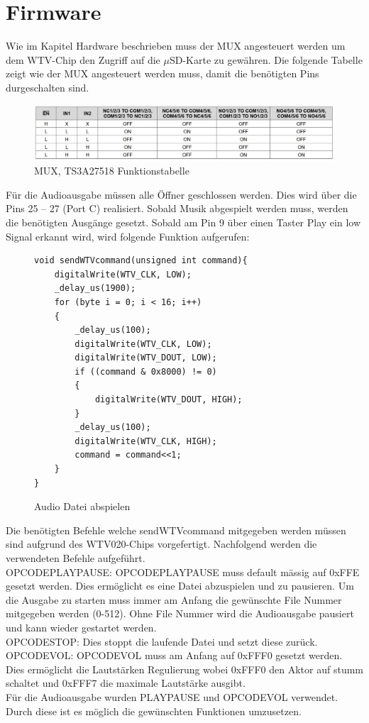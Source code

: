 \section{Firmware}
Wie im Kapitel Hardware beschrieben muss der MUX angesteuert werden um dem WTV-Chip den Zugriff auf die $\mu$SD-Karte zu gewähren. Die folgende Tabelle zeigt wie der MUX angesteuert werden muss, damit die benötigten Pins durgeschalten sind.

\begin{figure}[h]
	\centering
	\includegraphics[width=15cm]{Bilder/MuxTab.jpg}
	\caption{MUX, TS3A27518 Funktionstabelle}
	\label{MUX-Tabelle}
\end{figure}

Für die Audioausgabe müssen alle Öffner geschlossen werden. Dies wird über die Pins 25 – 27 (Port C) realisiert. Sobald Musik abgespielt werden muss, werden die benötigten Ausgänge gesetzt. Sobald am Pin 9 über einen Taster Play ein low Signal erkannt wird, wird folgende Funktion aufgerufen:
\begin{figure}[h]
	\begin{verbatim}
void sendWTVcommand(unsigned int command){
	digitalWrite(WTV_CLK, LOW);
	_delay_us(1900);
	for (byte i = 0; i < 16; i++)
	{
		_delay_us(100);
		digitalWrite(WTV_CLK, LOW);
		digitalWrite(WTV_DOUT, LOW);
		if ((command & 0x8000) != 0)
		{
			digitalWrite(WTV_DOUT, HIGH);
		}
		_delay_us(100);
		digitalWrite(WTV_CLK, HIGH);
		command = command<<1;
	}
}
	\end{verbatim}
	\caption{Audio Datei abspielen }
	\label{WTV-Play}
\end{figure}


Die benötigten Befehle welche sendWTVcommand mitgegeben werden müssen sind aufgrund des WTV020-Chips vorgefertigt.
\newpage Nachfolgend werden die verwendeten Befehle aufgeführt.\\
OPCODEPLAYPAUSE: OPCODEPLAYPAUSE muss default mässig auf 0xFFE gesetzt werden. Dies ermöglicht es eine Datei abzuspielen und zu pausieren. Um die Ausgabe zu starten muss immer am Anfang die gewünschte File Nummer mitgegeben werden (0-512). Ohne File Nummer wird die Audioausgabe pausiert und kann wieder gestartet werden.  \\
OPCODESTOP: Dies stoppt die laufende Datei und setzt diese zurück.\\
OPCODEVOL: OPCODEVOL muss am Anfang auf 0xFFF0 gesetzt werden. Dies ermöglicht die Lautstärken Regulierung wobei 0xFFF0 den Aktor auf stumm schaltet und 0xFFF7 die maximale Lautstärke ausgibt. \\
Für die Audioausgabe wurden PLAYPAUSE und OPCODEVOL verwendet. Durch diese ist es möglich die gewünschten Funktionen umzusetzen. 

